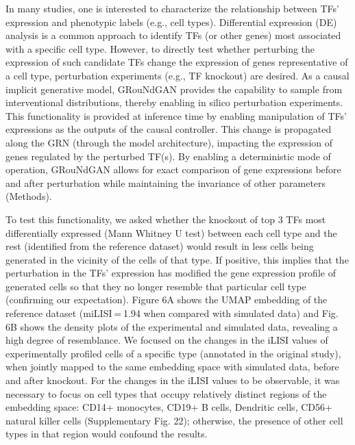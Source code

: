 In many studies, one is interested to characterize the relationship between TFs’ expression and phenotypic labels (e.g., cell types). Differential expression (DE) analysis is a common approach to identify TFs (or other genes) most associated with a specific cell type. However, to directly test whether perturbing the expression of such candidate TFs change the expression of genes representative of a cell type, perturbation experiments (e.g., TF knockout) are desired. As a causal implicit generative model, GRouNdGAN provides the capability to sample from interventional distributions, thereby enabling in silico perturbation experiments. This functionality is provided at inference time by enabling manipulation of TFs’ expressions as the outputs of the causal controller. This change is propagated along the GRN (through the model architecture), impacting the expression of genes regulated by the perturbed TF(s). By enabling a deterministic mode of operation, GRouNdGAN allows for exact comparison of gene expressions before and after perturbation while maintaining the invariance of other parameters (Methods).

To test this functionality, we asked whether the knockout of top 3 TFs most differentially expressed (Mann Whitney U test) between each cell type and the rest (identified from the reference dataset) would result in less cells being generated in the vicinity of the cells of that type. If positive, this implies that the perturbation in the TFs’ expression has modified the gene expression profile of generated cells so that they no longer resemble that particular cell type (confirming our expectation). Figure 6A shows the UMAP embedding of the reference dataset (miLISI = 1.94 when compared with simulated data) and Fig. 6B shows the density plots of the experimental and simulated data, revealing a high degree of resemblance. We focused on the changes in the iLISI values of experimentally profiled cells of a specific type (annotated in the original study), when jointly mapped to the same embedding space with simulated data, before and after knockout. For the changes in the iLISI values to be observable, it was necessary to focus on cell types that occupy relatively distinct regions of the embedding space: CD14+ monocytes, CD19+ B cells, Dendritic cells, CD56+ natural killer cells (Supplementary Fig. 22); otherwise, the presence of other cell types in that region would confound the results.

